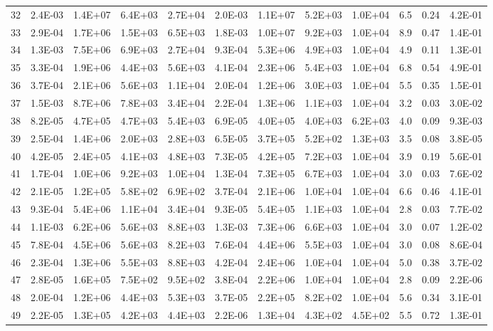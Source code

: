 \begin{tabular}{cccccccccccc}
32 & 2.4E-03 & 1.4E+07 & 6.4E+03 & 2.7E+04 & 2.0E-03 & 1.1E+07 & 5.2E+03 & 1.0E+04 & 6.5 & 0.24 & 4.2E-01 \\
33 & 2.9E-04 & 1.7E+06 & 1.5E+03 & 6.5E+03 & 1.8E-03 & 1.0E+07 & 9.2E+03 & 1.0E+04 & 8.9 & 0.47 & 1.4E-01 \\
34 & 1.3E-03 & 7.5E+06 & 6.9E+03 & 2.7E+04 & 9.3E-04 & 5.3E+06 & 4.9E+03 & 1.0E+04 & 4.9 & 0.11 & 1.3E-01 \\
35 & 3.3E-04 & 1.9E+06 & 4.4E+03 & 5.6E+03 & 4.1E-04 & 2.3E+06 & 5.4E+03 & 1.0E+04 & 6.8 & 0.54 & 4.9E-01 \\
36 & 3.7E-04 & 2.1E+06 & 5.6E+03 & 1.1E+04 & 2.0E-04 & 1.2E+06 & 3.0E+03 & 1.0E+04 & 5.5 & 0.35 & 1.5E-01 \\
37 & 1.5E-03 & 8.7E+06 & 7.8E+03 & 3.4E+04 & 2.2E-04 & 1.3E+06 & 1.1E+03 & 1.0E+04 & 3.2 & 0.03 & 3.0E-02 \\
38 & 8.2E-05 & 4.7E+05 & 4.7E+03 & 5.4E+03 & 6.9E-05 & 4.0E+05 & 4.0E+03 & 6.2E+03 & 4.0 & 0.09 & 9.3E-03 \\
39 & 2.5E-04 & 1.4E+06 & 2.0E+03 & 2.8E+03 & 6.5E-05 & 3.7E+05 & 5.2E+02 & 1.3E+03 & 3.5 & 0.08 & 3.8E-05 \\
40 & 4.2E-05 & 2.4E+05 & 4.1E+03 & 4.8E+03 & 7.3E-05 & 4.2E+05 & 7.2E+03 & 1.0E+04 & 3.9 & 0.19 & 5.6E-01 \\
41 & 1.7E-04 & 1.0E+06 & 9.2E+03 & 1.0E+04 & 1.3E-04 & 7.3E+05 & 6.7E+03 & 1.0E+04 & 3.0 & 0.03 & 7.6E-02 \\
42 & 2.1E-05 & 1.2E+05 & 5.8E+02 & 6.9E+02 & 3.7E-04 & 2.1E+06 & 1.0E+04 & 1.0E+04 & 6.6 & 0.46 & 4.1E-01 \\
43 & 9.3E-04 & 5.4E+06 & 1.1E+04 & 3.4E+04 & 9.3E-05 & 5.4E+05 & 1.1E+03 & 1.0E+04 & 2.8 & 0.03 & 7.7E-02 \\
44 & 1.1E-03 & 6.2E+06 & 5.6E+03 & 8.8E+03 & 1.3E-03 & 7.3E+06 & 6.6E+03 & 1.0E+04 & 3.0 & 0.07 & 1.2E-02 \\
45 & 7.8E-04 & 4.5E+06 & 5.6E+03 & 8.2E+03 & 7.6E-04 & 4.4E+06 & 5.5E+03 & 1.0E+04 & 3.0 & 0.08 & 8.6E-04 \\
46 & 2.3E-04 & 1.3E+06 & 5.5E+03 & 8.8E+03 & 4.2E-04 & 2.4E+06 & 1.0E+04 & 1.0E+04 & 5.0 & 0.38 & 3.7E-02 \\
47 & 2.8E-05 & 1.6E+05 & 7.5E+02 & 9.5E+02 & 3.8E-04 & 2.2E+06 & 1.0E+04 & 1.0E+04 & 2.8 & 0.09 & 2.2E-06 \\
48 & 2.0E-04 & 1.2E+06 & 4.4E+03 & 5.3E+03 & 3.7E-05 & 2.2E+05 & 8.2E+02 & 1.0E+04 & 5.6 & 0.34 & 3.1E-01 \\
49 & 2.2E-05 & 1.3E+05 & 4.2E+03 & 4.4E+03 & 2.2E-06 & 1.3E+04 & 4.3E+02 & 4.5E+02 & 5.5 & 0.72 & 1.3E-01 \\

\end{tabular}
